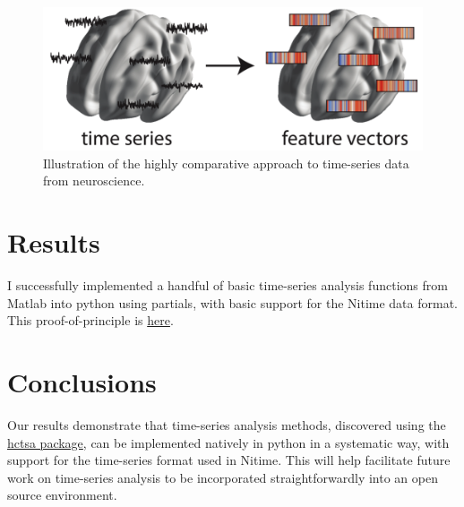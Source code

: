 \documentclass[twocolumn]{bmcart}%
\begin{document}
\begin{figure}[h!]
  \includegraphics[width=.47\textwidth]{nitime.png}
  \caption{\label{centfig} Illustration of the highly comparative approach to time-series data from neuroscience.}
\end{figure}

\section{Results}\label{results}

I successfully implemented a handful of basic time-series analysis
functions from Matlab into python using partials, with basic support for
the Nitime data format. This proof-of-principle is
\href{https://github.com/benfulcher/hctsa_python}{here}.

\section{Conclusions}\label{conclusions}

Our results demonstrate that time-series analysis methods, discovered
using the \href{https://github.com/benfulcher/hctsa}{hctsa package}, can
be implemented natively in python in a systematic way, with support for
the time-series format used in Nitime. This will help facilitate future
work on time-series analysis to be incorporated straightforwardly into
an open source environment.

\end{document}

